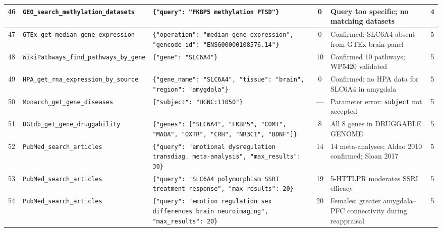 {\begin{longtable}{@{}c p{2.2cm} p{4.5cm} c p{4cm} c@{}}
46 &
\texttt{GEO\_search\_\allowbreak methylation\_\allowbreak datasets} &
\texttt{\{"query": "FKBP5 methylation PTSD"\}} &
0 &
Query too specific; no matching datasets &
4 \\
\midrule


47 &
\texttt{GTEx\_get\_\allowbreak median\_gene\_\allowbreak expression} &
\texttt{\{"operation": "median\_gene\_expression", "gencode\_id": "ENSG00000108576.14"\}} &
0 &
Confirmed: SLC6A4 absent from GTEx brain panel &
5 \\
\midrule

48 &
\texttt{WikiPathways\_\allowbreak find\_pathways\_\allowbreak by\_gene} &
\texttt{\{"gene": "SLC6A4"\}} &
10 &
Confirmed 10 pathways; WP5420 validated &
5 \\
\midrule

49 &
\texttt{HPA\_get\_rna\_\allowbreak expression\_\allowbreak by\_source} &
\texttt{\{"gene\_name": "SLC6A4", "tissue": "brain", "region": "amygdala"\}} &
0 &
Confirmed: no HPA data for SLC6A4 in amygdala &
5 \\
\midrule

50 &
\texttt{Monarch\_get\_\allowbreak gene\_diseases} &
\texttt{\{"subject": "HGNC:11050"\}} &
--- &
Parameter error: \texttt{subject} not accepted &
5 \\
\midrule

51 &
\texttt{DGIdb\_get\_\allowbreak gene\_\allowbreak druggability} &
\texttt{\{"genes": ["SLC6A4", "FKBP5", "COMT", "MAOA", "OXTR", "CRH", "NR3C1", "BDNF"]\}} &
8 &
All 8 genes in DRUGGABLE GENOME &
5 \\
\midrule

52 &
\texttt{PubMed\_search\_\allowbreak articles} &
\texttt{\{"query": "emotional dysregulation transdiag.\ meta-analysis", "max\_results": 30\}} &
14 &
14 meta-analyses; Aldao 2010 confirmed; Sloan 2017 &
5 \\
\midrule

53 &
\texttt{PubMed\_search\_\allowbreak articles} &
\texttt{\{"query": "SLC6A4 polymorphism SSRI treatment response", "max\_results": 20\}} &
19 &
5-HTTLPR moderates SSRI efficacy &
5 \\
\midrule

54 &
\texttt{PubMed\_search\_\allowbreak articles} &
\texttt{\{"query": "emotion regulation sex differences brain neuroimaging", "max\_results": 20\}} &
20 &
Females: greater amygdala--PFC connectivity during reappraisal &
5 \\

\end{longtable}
}

